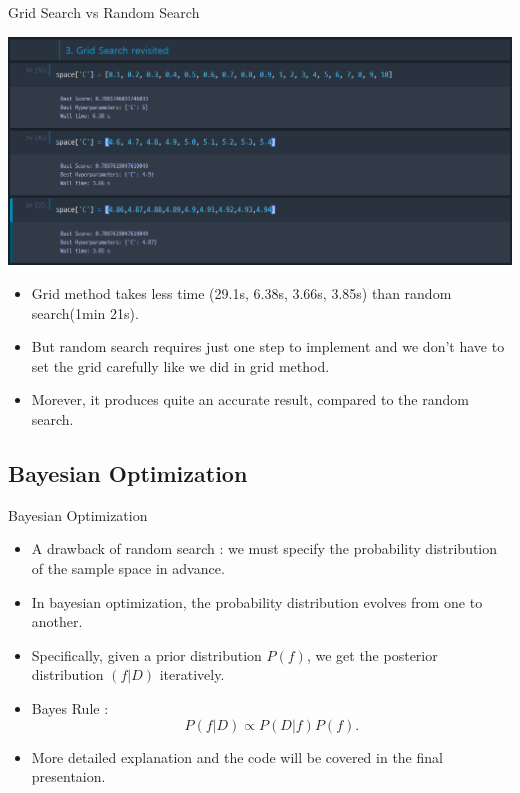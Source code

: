 \documentclass{beamer}
\begin{document}
%
\begin{frame}{Grid Search vs Random Search}
\begin{center}
\includegraphics[width=.75\textwidth]{2_4_grid_search_revisit}
\end{center}
\begin{itemize}
\item
Grid method takes less time (29.1s, 6.38s, 3.66s, 3.85s) than random search(1min 21s).
\item
But random search requires just one step to implement and we don't have to set the grid carefully like we did in grid method.
\item
Morever, it produces quite an accurate result, compared to the random search.
\end{itemize}
\end{frame}

\subsection{Bayesian Optimization}

%
\begin{frame}{Bayesian Optimization}
\begin{itemize}
\item
A drawback of random search : \alert{we must specify the probability distribution of the sample space in advance.}
\item
In bayesian optimization, the probability distribution evolves from one to another.
\item
Specifically, given a \alert{prior} distribution \(P(f)\), we get the \alert{posterior} distribution \((f|D)\) iteratively.
\item
Bayes Rule :\\
\[P(f|D)\propto P(D|f)P(f).\]
\item
More detailed explanation and the code will be covered in the final presentaion.
\end{itemize}
\end{frame}

\end{document}

